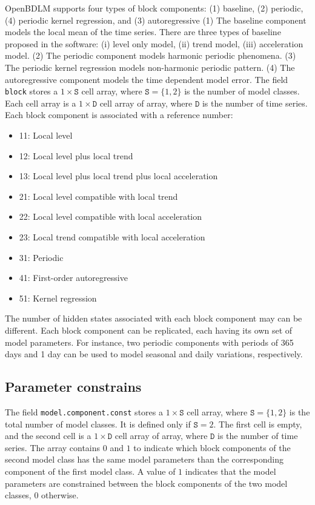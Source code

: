 OpenBDLM supports four types of block components: (1) baseline, (2) periodic, (4) periodic kernel regression, and (3) autoregressive 
(1) The baseline component models the local mean of the time series. 
There are three types of baseline proposed in the software: (i) level only model, (ii) trend model, (iii) acceleration model. 
(2) The periodic component models harmonic periodic phenomena. %
(3) The periodic kernel regression models non-harmonic periodic pattern.
(4) The autoregressive component models the time dependent model error.
The field \lstinline[basicstyle = \mlttfamily \small ]!block! stores a $1\times \mathtt{S}$ cell array, where $\mathtt{S} = \{1,2 \}$ is the number of model classes.
Each cell array is a $1\times \mathtt{D}$ cell array of array, where $\mathtt{D}$ is the number of time series.
Each block component is associated with a reference number:
\begin{itemize}
\item 11: Local level 
\item 12: Local level plus local trend
\item 13: Local level plus local trend plus local acceleration
\item 21: Local level compatible with local trend
\item 22: Local level compatible with local acceleration
\item 23: Local trend compatible with local acceleration
\item 31: Periodic
\item 41: First-order autoregressive
\item 51: Kernel regression
\end{itemize}
The number of hidden states associated with each block component may can be different. 
Each block component can be replicated, each having its own set of model parameters. 
For instance, two periodic components with periods of 365 days and 1 day can be used to model seasonal and daily variations, respectively.

\subsection{Parameter constrains}

The field \lstinline[basicstyle = \mlttfamily]!model.component.const! stores a $1\times \mathtt{S}$ cell array, where $\mathtt{S} = \{1, 2 \}$ is the total number of model classes.
It is defined only if $\mathtt{S} = 2$.
The first cell is empty, and the second cell is a $1\times \mathtt{D}$ cell array of array, where $\mathtt{D}$ is the number of time series.
The array contains $0$ and $1$ to indicate which block components of the second model class has the same model parameters than the corresponding component of the first model class. 
A value of $1$ indicates that the model parameters are constrained between the block components of the two model classes, $0$ otherwise.

